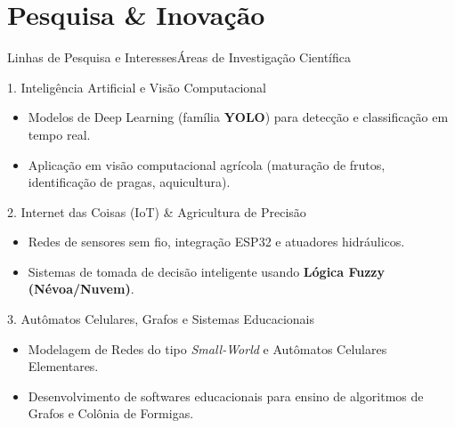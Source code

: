 \documentclass[9pt]{beamer}
\begin{document}
\section{Pesquisa \& Inovação}
\begin{frame}{Linhas de Pesquisa e Interesses}{Áreas de Investigação Científica}
  \begin{block}{1. Inteligência Artificial e Visão Computacional}
    \begin{itemize}
      \item Modelos de Deep Learning (família \textbf{YOLO}) para detecção e classificação em tempo real.
      \item Aplicação em visão computacional agrícola (maturação de frutos, identificação de pragas, aquicultura).
    \end{itemize}
  \end{block}

  \begin{block}{2. Internet das Coisas (IoT) \& Agricultura de Precisão}
    \begin{itemize}
      \item Redes de sensores sem fio, integração ESP32 e atuadores hidráulicos.
      \item Sistemas de tomada de decisão inteligente usando \textbf{Lógica Fuzzy (Névoa/Nuvem)}.
    \end{itemize}
  \end{block}

  \begin{block}{3. Autômatos Celulares, Grafos e Sistemas Educacionais}
    \begin{itemize}
      \item Modelagem de Redes do tipo \textit{Small-World} e Autômatos Celulares Elementares.
      \item Desenvolvimento de softwares educacionais para ensino de algoritmos de Grafos e Colônia de Formigas.
    \end{itemize}
  \end{block}
\end{frame}
\end{document}
